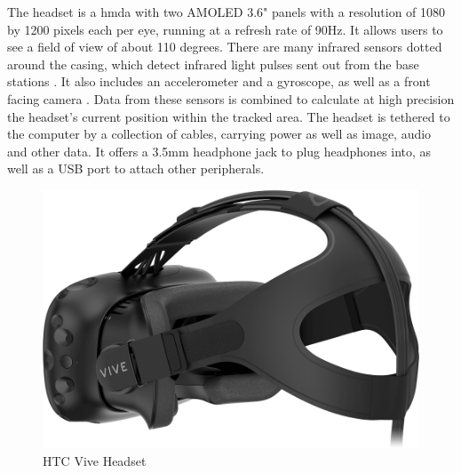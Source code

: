 The headset is a \gls{hmda} with two AMOLED 3.6" panels with a resolution of 1080 by 1200 pixels each per eye, running at a refresh rate of 90Hz. It allows users to see a field of view of about 110 degrees. 
\newline
There are many infrared sensors dotted around the casing, which detect infrared light pulses sent out from the base stations \autocite{lighthouseHowWork}. It also includes an accelerometer and a gyroscope, as well as a front facing camera \autocite{viveProductPage}. Data from these sensors is combined to calculate at high precision the headset's current position within the tracked area.
\newline
The headset is tethered to the computer by a collection of cables, carrying power as well as image, audio and other data. It offers a 3.5mm headphone jack to plug headphones into, as well as a USB port to attach other peripherals.
\begin{figure}[h]
    \centering
    \includegraphics[height=0.2\textheight]{figures/vive-hardware-hmd-1}
    \caption{HTC Vive Headset \autocite{viveProductPage}}
    \label{fig:headset}
\end{figure}


